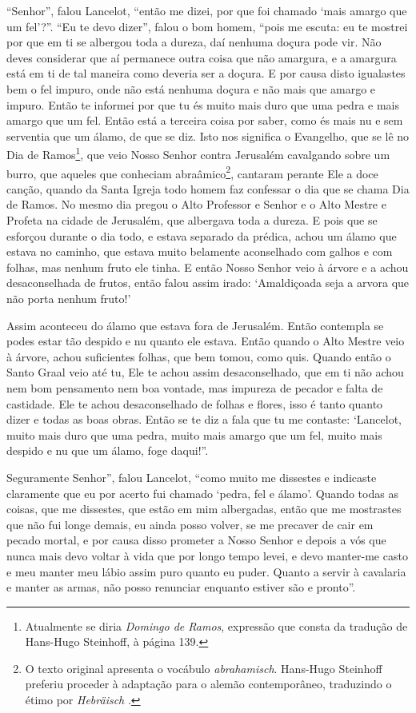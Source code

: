 “Senhor”, falou Lancelot, “então me dizei, por que foi chamado ‘mais amargo que
um fel’?”. “Eu te devo dizer”, falou o bom homem, “pois me escuta: eu te
mostrei por que em ti se albergou toda a dureza, daí nenhuma doçura pode vir.
Não deves considerar que aí permanece outra coisa que não amargura, e a
amargura está em ti de tal maneira como deveria ser a doçura. E por causa disto
igualastes bem o fel impuro, onde não está nenhuma doçura e não mais que amargo
e impuro. Então te informei por que tu és muito mais duro que uma pedra e mais
amargo que um fel. Então está a terceira coisa por saber, como és mais nu e sem
serventia que um álamo, de que se diz. Isto nos significa o Evangelho, que se
lê no Dia de Ramos\footnote{ Atualmente se diria \textit{Domingo de Ramos},
expressão que consta da tradução de Hans-Hugo Steinhoff, à página 139. 
 }, que veio Nosso Senhor contra Jerusalém cavalgando sobre um burro, que
aqueles que conheciam abraâmico\footnote{ O texto original apresenta o vocábulo
\textit{abrahamisch}. Hans-Hugo Steinhoff preferiu proceder à
adaptação para o alemão contemporâneo, traduzindo o étimo por
\textit{Hebräisch} .}, cantaram perante Ele a doce
canção, quando da Santa Igreja todo homem faz confessar o dia que se chama Dia
de Ramos. No mesmo dia pregou o Alto Professor e Senhor e o Alto Mestre e
Profeta na cidade de Jerusalém, que albergava toda a dureza. E pois que se
esforçou durante o dia todo, e estava separado da prédica, achou um álamo que
estava no caminho, que estava muito belamente aconselhado com galhos e com
folhas, mas nenhum fruto ele tinha. E então Nosso Senhor veio à árvore e a
achou desaconselhada de frutos, então falou assim irado: ‘Amaldiçoada seja a
arvora que não porta nenhum fruto!’ 

Assim aconteceu do álamo que estava fora de Jerusalém. Então contempla se podes
estar tão despido e nu quanto ele estava. Então quando o Alto Mestre veio à
árvore, achou suficientes folhas, que bem tomou, como quis. Quando então o
Santo Graal veio até tu, Ele te achou assim desaconselhado, que em ti não achou
nem bom pensamento nem boa vontade, mas impureza de pecador e falta de
castidade. Ele te achou desaconselhado de folhas e flores, isso é tanto quanto
dizer e todas as boas obras. Então se te diz a fala que tu me contaste:
‘Lancelot, muito mais duro que uma pedra, muito mais amargo que um fel, muito
mais despido e nu que um álamo, foge daqui!”. 

Seguramente Senhor”, falou Lancelot, “como muito me dissestes e indicaste
claramente que eu por acerto fui chamado ‘pedra, fel e álamo’. Quando todas as
coisas, que me dissestes, que estão em mim albergadas, então que me mostrastes
que não fui longe demais, eu ainda posso volver, se me precaver de cair em
pecado mortal, e por causa disso prometer a Nosso Senhor e depois a vós que
nunca mais devo voltar à vida que por longo tempo levei, e devo manter-me casto
e meu manter meu lábio assim puro quanto eu puder. Quanto a servir à cavalaria
e manter as armas, não posso renunciar enquanto estiver são e pronto”.


